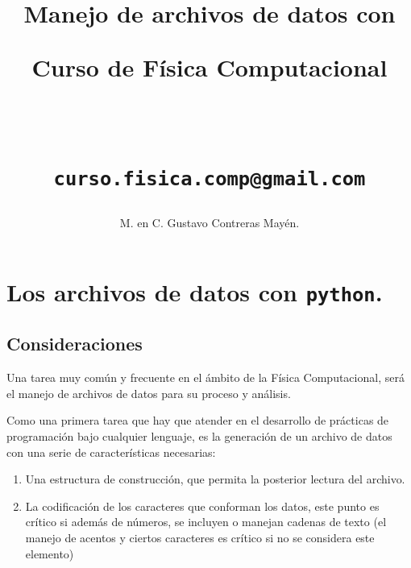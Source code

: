 \documentclass[12pt]{article}
\author{M. en C. Gustavo Contreras Mayén.}
\title{Manejo de archivos de datos con \python \\ \begin{Large} Curso de Física Computacional\end{Large} \\
\begin{small}
\texttt{curso.fisica.comp@gmail.com}
\end{small}}
\date{ }
\newcommand{\python}{\texttt{python}}
\begin{document}
\maketitle
\fontsize{14}{14}\selectfont
\section{Los archivos de datos con \python.}
\subsection{Consideraciones}
Una tarea muy común y frecuente en el ámbito de la Física Computacional, será el manejo de archivos de datos para su proceso y análisis.
\par
Como una primera tarea que hay que atender en el desarrollo de prácticas de programación bajo cualquier lenguaje, es la generación de un archivo de datos con una serie de características necesarias:
\begin{enumerate}
\item Una estructura de construcción, que permita la posterior lectura del archivo.
\item La codificación de los caracteres que conforman los datos, este punto es crítico si además de números, se incluyen o manejan cadenas de texto (el manejo de acentos y ciertos caracteres es crítico si no se considera este elemento)
\end{enumerate}
\end{document}
